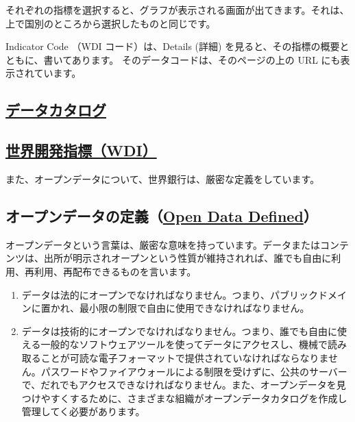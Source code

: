 \documentclass[
  xelatex, ja=standard]{bxjsbook}
\theoremstyle{definition}
\theoremstyle{definition}
\theoremstyle{definition}
\theoremstyle{definition}
\theoremstyle{remark}
\begin{document}
それぞれの指標を選択すると、グラフが表示される画面が出てきます。それは、上で国別のところから選択したものと同じです。

Indicator Code （WDI コード）は、Details (詳細) を見ると、その指標の概要とともに、書いてあります。 そのデータコードは、そのページの上の URL にも表示されています。

\hypertarget{ux30c7ux30fcux30bfux30abux30bfux30edux30b0}{%
\subsection{\texorpdfstring{\href{https://datacatalog.worldbank.org/home}{データカタログ}}{データカタログ}}\label{ux30c7ux30fcux30bfux30abux30bfux30edux30b0}}

\hypertarget{ux4e16ux754cux958bux767aux6307ux6a19wdi}{%
\subsection{\texorpdfstring{\href{https://datatopics.worldbank.org/world-development-indicators/}{世界開発指標（WDI）}}{世界開発指標（WDI）}}\label{ux4e16ux754cux958bux767aux6307ux6a19wdi}}

また、オープンデータについて、世界銀行は、厳密な定義をしています。

\hypertarget{ux30aaux30fcux30d7ux30f3ux30c7ux30fcux30bfux306eux5b9aux7fa9open-data-defined}{%
\subsection{\texorpdfstring{オープンデータの定義（\href{http://opendatatoolkit.worldbank.org/en/essentials.html}{Open Data Defined}）}{オープンデータの定義（Open Data Defined）}}\label{ux30aaux30fcux30d7ux30f3ux30c7ux30fcux30bfux306eux5b9aux7fa9open-data-defined}}

オープンデータという言葉は、厳密な意味を持っています。データまたはコンテンツは、出所が明示されオープンという性質が維持されれば、誰でも自由に利用、再利用、再配布できるものを言います。

\begin{enumerate}
\def\labelenumi{\arabic{enumi}.}
\item
  データは法的にオープンでなければなりません。つまり、パブリックドメインに置かれ、最小限の制限で自由に使用できなければなりません。
\item
  データは技術的にオープンでなければなりません。つまり、誰でも自由に使える一般的なソフトウェアツールを使ってデータにアクセスし、機械で読み取ることが可読な電子フォーマットで提供されていなければならなりません。パスワードやファイアウォールによる制限を受けずに、公共のサーバーで、だれでもアクセスできなければなりません。また、オープンデータを見つけやすくするために、さまざまな組織がオープンデータカタログを作成し管理してく必要があります。
\end{enumerate}
\end{document}

